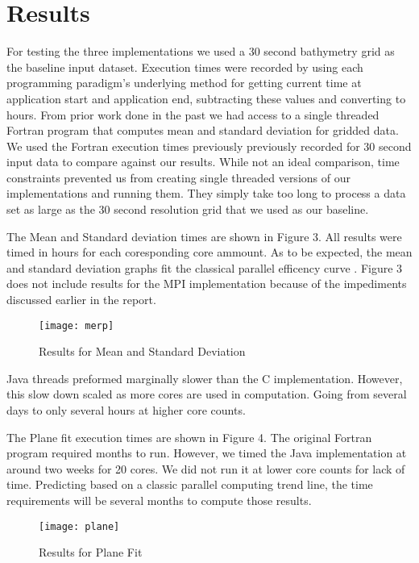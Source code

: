 \section{Results}
For testing the three implementations we used a 30 second bathymetry grid as the baseline input dataset. 
Execution times were recorded by using each programming paradigm’s underlying method for getting current time at application start and application end, subtracting these values and converting to hours. 
From prior work done in the past we had access to a single threaded Fortran program that computes mean and standard deviation for gridded data.  
We used the Fortran execution times previously previously recorded for 30 second input data to compare against our results.  
While not an ideal comparison, time constraints prevented us from creating single threaded versions of our implementations and running them.  
They simply take too long to process a data set as large as the 30 second resolution grid that we used as our baseline.

\par
The Mean and Standard deviation times are shown in Figure 3.
All results were timed in hours for each coresponding core ammount.
As to be expected, the mean and standard deviation graphs fit the classical parallel efficency curve \cite{buzbee}.
Figure 3 does not include results for the MPI implementation because of the impediments discussed earlier in the report.
\begin{figure}[h]
    \centering
    \texttt{[image: merp]}
    \caption{Results for Mean and Standard Deviation}
    \label{fig:3}
\end{figure}

\par
Java threads preformed marginally slower than the C implementation.
However, this slow down scaled as more cores are used in computation.
Going from several days to only several hours at higher core counts.


\par
The Plane fit execution times are shown in Figure 4.
The original Fortran program required months to run.
However, we timed the Java implementation at around two weeks for 20 cores.
We did not run it at lower core counts for lack of time.
Predicting based on a classic parallel computing trend line, the time requirements will be several months to compute those results.

\begin{figure}[h]
    \centering
    \texttt{[image: plane]}
    \caption{Results for Plane Fit}
    \label{fig:4}
\end{figure}


